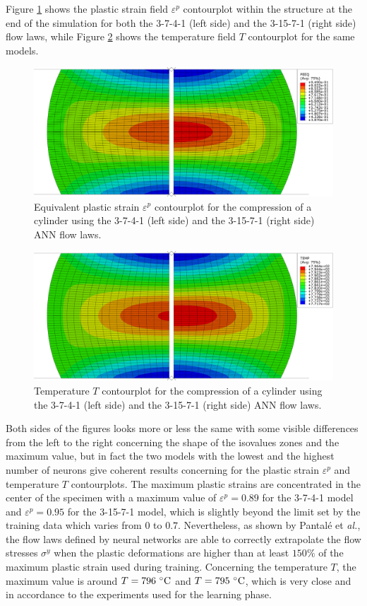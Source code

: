 \documentclass[algorithms,article,submit,pdftex,moreauthors]{Definitions/mdpi}
\makeatletter
\DeclareRobustCommand{\eal}{et \emph{al.}\@\xspace}
\makeatother
\begin{document}
Figure \ref{fig:peeqContourplot} shows the plastic strain field $\varepsilon^p$ contourplot within the structure at the end of the simulation for both the 3-7-4-1 (left side) and the 3-15-7-1 (right side) flow laws, while Figure \ref{fig:dpeeqContourplot} shows the temperature field $T$ contourplot for the same models.
\begin{figure}[!ht]
\centering
\includegraphics[width=0.90\columnwidth]{Figures/peeq}
\caption{Equivalent plastic strain $\varepsilon^p$ contourplot for the compression of a cylinder using the 3-7-4-1 (left side) and the 3-15-7-1 (right side) ANN flow laws.}
\label{fig:peeqContourplot}
\end{figure}
\begin{figure}[!ht]
\centering
\includegraphics[width=0.90\columnwidth]{Figures/temp}
\caption{Temperature $T$ contourplot for the compression of a cylinder using the 3-7-4-1 (left side) and the 3-15-7-1 (right side) ANN flow laws.}
\label{fig:dpeeqContourplot}
\end{figure}
Both sides of the figures looks more or less the same with some visible differences from the left to the right concerning the shape of the isovalues zones and the maximum value, but in fact the two models with the lowest and the highest number of neurons give coherent results concerning for the plastic strain $\varepsilon^p$ and temperature $T$ contourplots.
The maximum plastic strains are concentrated in the center of the specimen with a maximum value of $\varepsilon^p=0.89$ for the 3-7-4-1 model and $\varepsilon^p=0.95$ for the 3-15-7-1 model, which is slightly beyond the limit set by the training data which varies from $0$ to $0.7$.
Nevertheless, as shown by Pantalé \eal \cite{Pantale-2021}, the flow laws defined by neural networks are able to correctly extrapolate the flow stresses $\sigma^y$ when the plastic deformations are higher than at least $150\%$ of the maximum plastic strain used during training.
Concerning the temperature $T$, the maximum value is around $T=796~\celsius$ and $T=795~\celsius$, which is very close and in accordance to the experiments used for the learning phase.
\end{document}
